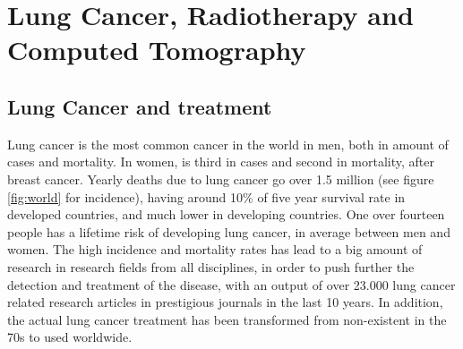 \chapter{Lung Cancer, Radiotherapy and Computed Tomography}\label{ch:soa}

\section{Lung Cancer and treatment}


Lung cancer is the most common cancer in the world in men, both in amount of cases and mortality. In women, is third in cases and second in mortality, after breast cancer\cite{WCR2014}. Yearly deaths due to lung cancer go over 1.5 million (see figure \ref{fig:world} for incidence), having around 10\% of five year survival rate in developed countries, and much lower in developing countries\cite{CRUK2014}. One over fourteen people has a lifetime risk of developing lung cancer\cite{Harrisons2012}, in average between men and women. The high incidence and mortality rates has lead to a big amount of research in research fields from all disciplines, in order to push further the detection and treatment of the disease, with an output of over 23.000 lung cancer related research articles in prestigious journals in the last 10 years\cite{Nature2015}. In addition, the  actual lung cancer treatment has been transformed from non-existent in the 70s to used worldwide\cite{Comis2003}.


